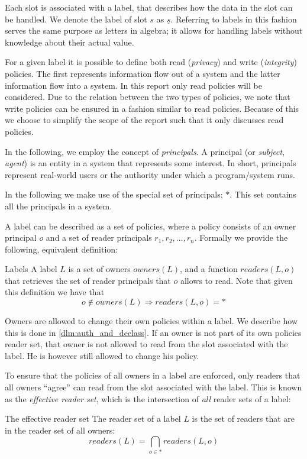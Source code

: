 Each slot is associated with a label, that describes how the data in the slot can be handled.
We denote the label of slot $s$ as $\underline{s}$.
Referring to labels in this fashion serves the same purpose as letters in algebra; it allows for handling labels without knowledge about their actual value.

For a given label it is possible to define both read (\emph{privacy}) and write (\emph{integrity}) policies.
The first represents information flow out of a system and the latter information flow into a system.
In this report only read policies will be considered.
Due to the relation between the two types of policies, we note that write policies can be ensured in a fashion similar to read policies.
Because of this we choose to simplify the scope of the report such that it only discusses read policies.

In the following, we employ the concept of \emph{principals}.
A principal (or \emph{subject}, \emph{agent}) is an entity in a system that represents some interest.
In short, principals represent real-world users or the authority under which a program/system runs.

In the following we make use of the special set of principals; $*$.
This set contains all the principals in a system.

A label can be described as a set of policies, where a policy consists of an owner principal $o$ and a set of reader principals $r_1, r_2, \dots, r_n$.
Formally we provide the following, equivalent definition:
\begin{definition}{Labels}\label{dlm:def:label}
A label $L$ is a set of owners $owners(L)$, and a function $readers(L, o)$ that retrieves the set of reader principals that $o$ allows to read.
Note that given this definition we have that $$o \notin owners(L) \Rightarrow readers(L, o) = *$$
\end{definition}

Owners are allowed to change their own policies within a label.
We describe how this is done in \cref{dlm:auth_and_declass}.
If an owner is not part of its own policies reader set, that owner is not allowed to read from the slot associated with the label.
He is however still allowed to change his policy.

To ensure that the policies of all owners in a label are enforced, only readers that all owners ``agree'' can read from the slot associated with the label.
This is known as the \emph{effective reader set}, which is the intersection of \emph{all} reader sets of a label:
\begin{definition}{The effective reader set}
  The reader set of a label $L$ is the set of readers that are in the reader set of all owners:
  $$readers(L) = \bigcap_{o \in *} readers(L, o)$$
\end{definition}


